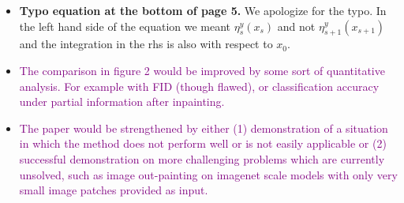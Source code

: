 \documentclass{article}
\newcommand{\question}[1]{\textcolor{purple}{#1}}
\begin{document}
\begin{itemize}
    \item \textbf{Typo equation at the bottom of page 5.} We apologize for the typo. In the left hand side of the equation we meant $\eta^y _{s}(x_s)$ and not $\eta^y _{s+1}(x_{s+1})$ and the integration in the rhs is also with respect to $x_0$.
    \item \question{The comparison in figure 2 would be improved by some sort of quantitative analysis. For example with FID (though flawed), or classification accuracy under partial information after inpainting.} 
    \item \question{The paper would be strengthened by either (1) demonstration of a situation in which the method does not perform well or is not easily applicable or (2) successful demonstration on more challenging problems which are currently unsolved, such as image out-painting on imagenet scale models with only very small image patches provided as input.} 
\end{itemize}
\end{document}
